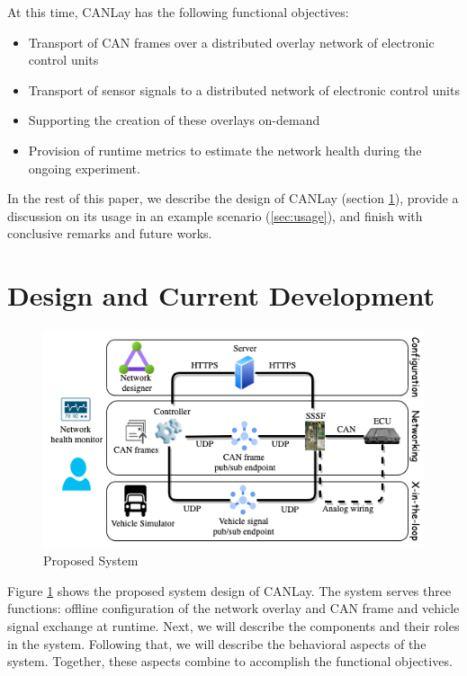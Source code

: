 \documentclass[letterpaper,twocolumn,12pt]{article}
\begin{document}
At this time, CANLay has the following functional objectives:
\begin{itemize}
    \item Transport of CAN frames over a distributed overlay network of electronic control units
    \item Transport of sensor signals to a distributed network of electronic control units
    \item Supporting the creation of these overlays on-demand
    \item Provision of runtime metrics to estimate the network health during the ongoing experiment.
\end{itemize}
In the rest of this paper, we describe the design of CANLay (section \ref{sec:design}), provide a discussion on its usage in an example scenario (\ref{sec:usage}), and finish with conclusive remarks and future works.

\section{Design and Current Development}\label{sec:design}
\begin{figure}[]
    \centering
    \includegraphics[width=\linewidth]{images/system_design.drawio.png}
    \caption{Proposed System}
    \label{fig:system}
\end{figure}
Figure \ref{fig:system} shows the proposed system design of CANLay. The system serves three functions: offline configuration of the network overlay and CAN frame and vehicle signal exchange at runtime. 
Next, we will describe the components and their roles in the system. 
Following that, we will describe the behavioral aspects of the system. 
Together, these aspects combine to accomplish the functional objectives.
\end{document}
